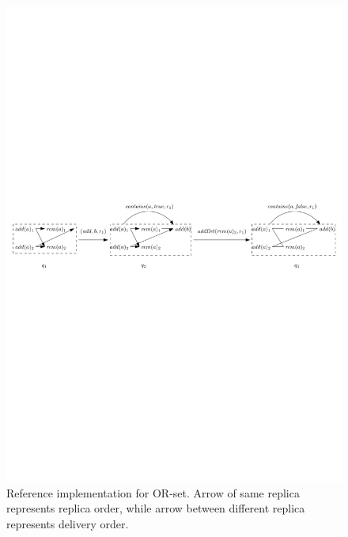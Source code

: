 \begin{figure}[t]
  \centering
  \includegraphics[width=1 \textwidth]{figures/PIC-RImp.pdf}
  \caption{Reference implementation for OR-set. Arrow of same replica represents replica order, while arrow between different replica represents delivery order.}
  \label{fig:reference implementation for OR-set}
\end{figure}

